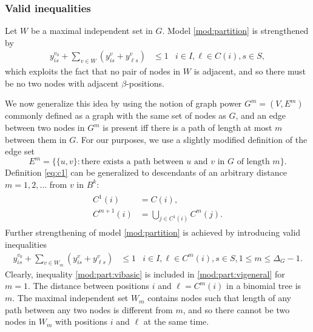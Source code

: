 \subsubsection{Valid inequalities}
Let $W$ be a maximal independent set in $G$.
Model \eqref{mod:partition} is strengthened by
\begin{align}
\label{mod:part:vibasic}
y^{v_0}_{is}+ \sum\limits_{v\in W}(y^v_{is}+y^v_{\ell s})&\leq 1 & i\in I,\ell\in C(i), s\in S,
\end{align}
which exploits the fact that no pair of nodes in $W$ is adjacent, and so there must be no two nodes with adjacent $\beta$-positions.

We now generalize this idea by using the notion of graph power $G^m=(V,E^m)$ commonly defined as a graph with the same set of nodes as $G$,
and an edge between two nodes in $G^m$ is present iff there is a path of length at most $m$ between them in $G$.
For our purposes, we use a slightly modified definition of the edge set
$$E^m=\{\{u,v\}:\text{there exists a path between $u$ and $v$ in $G$ of length $m$}\}.$$
Definition \eqref{eq:c1} can be generalized to descendants of an arbitrary distance $m=1,2,\dots$ from $v$ in $B^k$:
\begin{align}
\begin{split}
	C^{1}(i)&=C(i),\\
	C^{m+1}(i)&=\bigcup_{j\in C^1(i)}C^m(j).
\end{split}
\end{align}
Further strengthening of model \eqref{mod:partition} is achieved by introducing valid inequalities
\begin{align}
\label{mod:part:vigeneral}
y^{v_0}_{is}+ \sum\limits_{v\in W_m}(y^v_{is}+y^v_{\ell s})&\leq 1 & i\in I,\ell\in C^m(i), s\in S,1\leq m\leq \Delta_G-1.
\end{align}
Clearly, inequality \eqref{mod:part:vibasic} is included in \eqref{mod:part:vigeneral} for $m=1$.
The distance between positions $i$ and $\ell=C^m(i)$ in a binomial tree is $m$.
The maximal independent set $W_m$ contains nodes such that length of any path between any two nodes is different from $m$,
and so there cannot be two nodes in $W_m$ with positions $i$ and $\ell$ at the same time.

